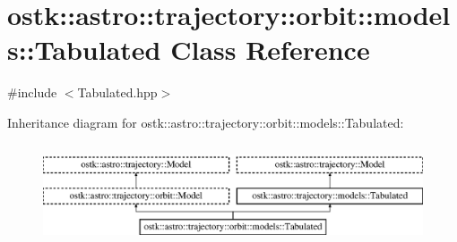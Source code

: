 \hypertarget{classostk_1_1astro_1_1trajectory_1_1orbit_1_1models_1_1_tabulated}{}\section{ostk\+:\+:astro\+:\+:trajectory\+:\+:orbit\+:\+:models\+:\+:Tabulated Class Reference}
\label{classostk_1_1astro_1_1trajectory_1_1orbit_1_1models_1_1_tabulated}


{\ttfamily \#include $<$Tabulated.\+hpp$>$}

Inheritance diagram for ostk\+:\+:astro\+:\+:trajectory\+:\+:orbit\+:\+:models\+:\+:Tabulated\+:\begin{figure}[H]
\begin{center}
\leavevmode
\includegraphics[height=3.000000cm]{classostk_1_1astro_1_1trajectory_1_1orbit_1_1models_1_1_tabulated}
\end{center}
\end{figure}

